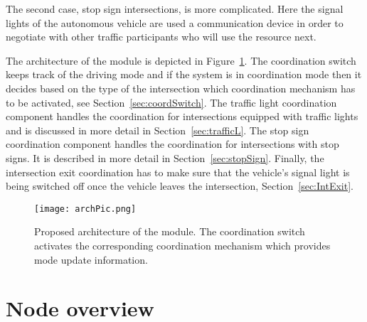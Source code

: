 \documentclass[11pt]{article}
\theoremstyle{definition}
\begin{document}
The second case, stop sign intersections, is more complicated. Here the signal lights of the autonomous vehicle are used a communication device in order to negotiate with other traffic participants who will use the resource next.

The architecture of the module is depicted in Figure~\ref{fig:ModuleArchitecture}. The coordination switch keeps track of the driving mode and if the system is in coordination mode then it decides based on the type of the intersection which coordination mechanism has to be activated, see Section~\ref{sec:coordSwitch}. The traffic light coordination component handles the coordination for intersections equipped with traffic lights and is discussed in more detail in Section~\ref{sec:trafficL}. The stop sign coordination component handles the coordination for intersections with stop signs. It is described in more detail in Section~\ref{sec:stopSign}. Finally, the intersection exit coordination has to make sure that the vehicle's signal light is being switched off once the vehicle leaves the intersection, Section~\ref{sec:IntExit}.
%
\begin{figure}[hbt]
\begin{center}
\texttt{[image: archPic.png]}
\end{center}
\caption{Proposed architecture of the module. The coordination switch activates the corresponding coordination mechanism which provides mode update information.}
\label{fig:ModuleArchitecture}
\end{figure}


%
%
%
%
\section{Node overview}\label{sec:nodeOverview}
\end{document}
